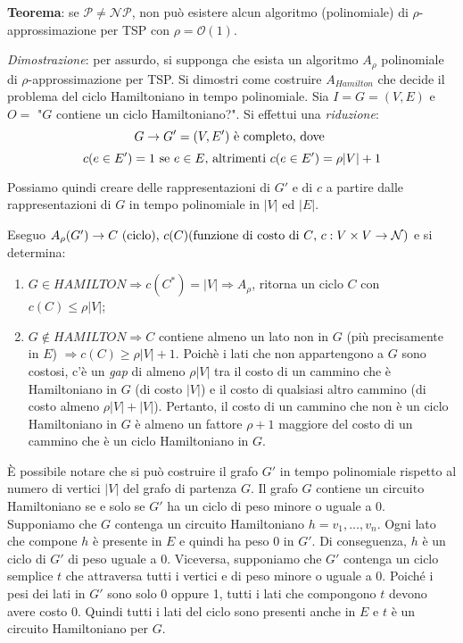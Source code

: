 \textbf{Teorema}: se $\mathcal{P} \ne \mathcal{NP}$, non può esistere alcun algoritmo
(polinomiale) di $\rho$-approssimazione per TSP con $\rho = \mathcal{O}(1)$.

\textit{Dimostrazione}: per assurdo, si supponga che esista un algoritmo $A_\rho$
polinomiale di $\rho$-approssimazione per TSP. Si dimostri come costruire $A_{Hamilton}$
che decide il problema del ciclo Hamiltoniano in tempo polinomiale. Sia $I = G =(V,E)$
e $O = $ "$G$ contiene un ciclo Hamiltoniano?". Si effettui una \textit{riduzione}:
\[
    G \rightarrow G' = (V, E') \textnormal{ è completo, dove }
\]
\[
    c(e \in E') = 1 \textnormal{ se } e \in E \textnormal{, altrimenti } c(e \in E') = \rho|V| + 1
\]

Possiamo quindi creare delle rappresentazioni di $G'$ e di $c$ a partire dalle rappresentazioni
di $G$ in tempo polinomiale in $|V|$ ed $|E|$.

Eseguo $A_\rho(G') \rightarrow C \textnormal{ (ciclo), } c(C) \textnormal{(funzione di costo di $C$, $c: V \times V \rightarrow \mathcal{N}$)}$ e si
determina:
\begin{enumerate}
\item $G \in HAMILTON \Rightarrow c(C^*) = |V| \Rightarrow A_\rho$, ritorna un ciclo $C$
con $c(C) \le \rho|V|$;
\item $G \not\in HAMILTON \Rightarrow C$ contiene almeno un lato non in
$G$ (più precisamente in $E$) $\Rightarrow c(C) \ge \rho|V| + 1$. Poichè i lati che non
appartengono a $G$ sono costosi, c'è un \textit{gap} di almeno $\rho |V|$ tra il costo di un cammino
che è Hamiltoniano in $G$ (di costo $|V|$) e il costo di qualsiasi altro cammino (di costo
almeno $\rho |V| + |V|$). Pertanto, il costo di un cammino che non è un ciclo Hamiltoniano
in $G$ è almeno un fattore $\rho + 1$ maggiore del costo di un cammino che è un ciclo
Hamiltoniano in $G$.
\end{enumerate}

È possibile notare che si può costruire il grafo $G'$ in tempo polinomiale rispetto al numero
di vertici $|V|$ del grafo di partenza $G$. Il grafo $G$ contiene un circuito Hamiltoniano se e
solo se $G'$ ha un ciclo di peso minore o uguale a 0. Supponiamo che $G$ contenga un circuito
Hamiltoniano $h = v_1, ..., v_n$. Ogni lato che compone $h$ è presente in $E$ e quindi ha peso 0 in $G'$.
Di conseguenza, $h$ è un ciclo di $G'$ di peso uguale a 0. Viceversa, supponiamo che $G'$ contenga un ciclo
semplice $t$ che attraversa tutti i vertici e di peso minore o uguale a 0. Poiché i pesi dei lati
in $G'$ sono solo 0 oppure 1, tutti i lati che compongono $t$ devono avere costo 0. Quindi tutti i
lati del ciclo sono presenti anche in $E$ e $t$ è un circuito Hamiltoniano per $G$.


